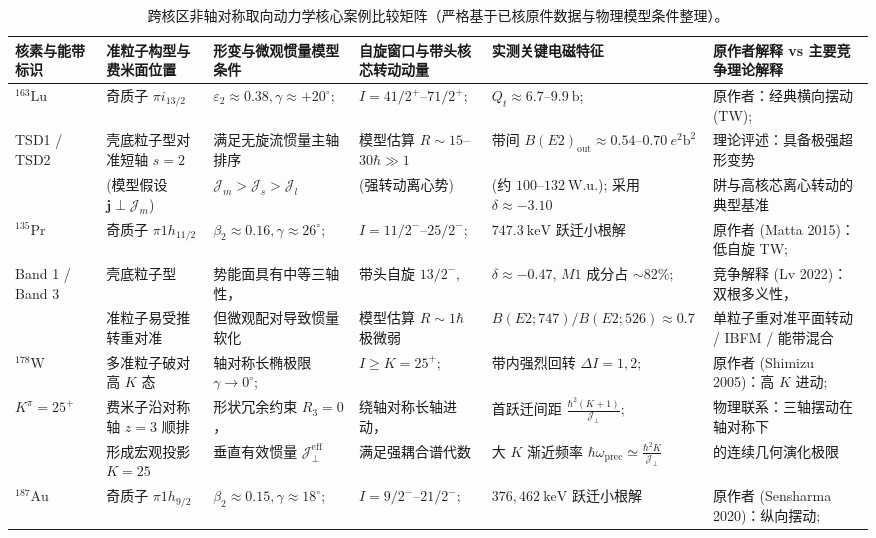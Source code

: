 \begin{table}[!htbp]
\centering
\small
\caption{跨核区非轴对称取向动力学核心案例比较矩阵（严格基于已核原件数据与物理模型条件整理）。}\label{tab:4-4-cross-region-comparison}
\begin{tabularx}{\textwidth}{lXXXXX}
\hline\hline
核素与能带标识 & 准粒子构型与费米面位置 & 形变与微观惯量模型条件 & 自旋窗口与带头核芯转动动量 & 实测关键电磁特征 & 原作者解释 vs 主要竞争理论解释 \\
\hline
$^{163}\mathrm{Lu}$ & 奇质子 $\pi i_{13/2}$ & $\varepsilon_2 \approx 0.38, \gamma \approx +20^\circ$; & $I = 41/2^+$--$71/2^+$; & $Q_t \approx 6.7$--$9.9\ \mathrm{b}$; & 原作者：经典横向摆动 (TW); \\
TSD1 / TSD2 & 壳底粒子型对准短轴 $s=2$ & 满足无旋流惯量主轴排序 & 模型估算 $R \sim 15$--$30\hbar \gg 1$ & 带间 $B(E2)_{\mathrm{out}} \approx 0.54$--$0.70\ e^2\mathrm{b}^2$ & 理论评述：具备极强超形变势 \\
& (模型假设 $\mathbf{j} \perp \mathcal{J}_m$) & $\mathcal{J}_m > \mathcal{J}_s > \mathcal{J}_l$ & (强转动离心势) & (约 $100$--$132\ \mathrm{W.u.}$); 采用 $\delta \approx -3.10$ & 阱与高核芯离心转动的典型基准 \\
\hline
$^{135}\mathrm{Pr}$ & 奇质子 $\pi 1h_{11/2}$ & $\beta_2 \approx 0.16, \gamma \approx 26^\circ$; & $I = 11/2^-$--$25/2^-$; & $747.3\ \mathrm{keV}$ 跃迁小根解 & 原作者 (Matta 2015)：低自旋 TW; \\
Band 1 / Band 3 & 壳底粒子型 & 势能面具有中等三轴性， & 带头自旋 $13/2^-$, & $\delta \approx -0.47$, $M1$ 成分占 $\sim 82\%$; & 竞争解释 (Lv 2022)：双根多义性， \\
& 准粒子易受推转重对准 & 但微观配对导致惯量软化 & 模型估算 $R \sim 1\hbar$ 极微弱 & $B(E2; 747)/B(E2; 526) \approx 0.7$ & 单粒子重对准平面转动 / IBFM / 能带混合 \\
\hline
$^{178}\mathrm{W}$ & 多准粒子破对高 $K$ 态 & 轴对称长椭极限 $\gamma \to 0^\circ$; & $I \ge K = 25^+$; & 带内强烈回转 $\Delta I = 1, 2$; & 原作者 (Shimizu 2005)：高 $K$ 进动; \\
$K^\pi = 25^+$ & 费米子沿对称轴 $z=3$ 顺排 & 形状冗余约束 $R_3 = 0$， & 绕轴对称长轴进动， & 首跃迁间距 $\frac{\hbar^2(K+1)}{\mathcal{J}_\perp}$; & 物理联系：三轴摆动在轴对称下 \\
& 形成宏观投影 $K = 25$ & 垂直有效惯量 $\mathcal{J}_\perp^{\text{eff}}$ & 满足强耦合谱代数 & 大 $K$ 渐近频率 $\hbar\omega_{\mathrm{prec}} \simeq \frac{\hbar^2 K}{\mathcal{J}_\perp}$ & 的连续几何演化极限 \\
\hline
$^{187}\mathrm{Au}$ & 奇质子 $\pi 1h_{9/2}$ & $\beta_2 \approx 0.15, \gamma \approx 18^\circ$; & $I = 9/2^-$--$21/2^-$; & $376, 462\ \mathrm{keV}$ 跃迁小根解 & 原作者 (Sensharma 2020)：纵向摆动; \\

\end{tabularx}
\end{table}
